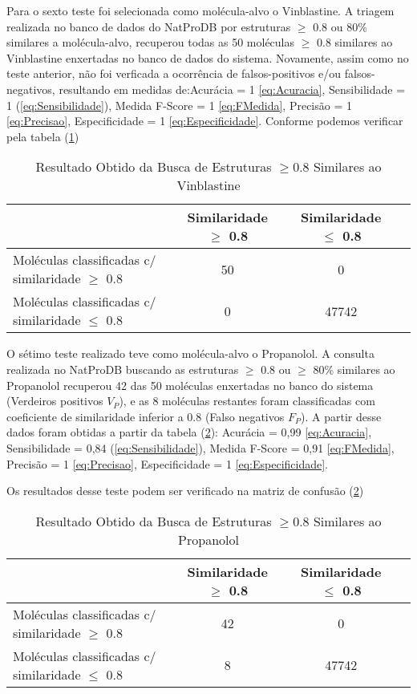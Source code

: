 Para o sexto teste foi selecionada como molécula-alvo o Vinblastine. A triagem realizada no banco de dados do NatProDB por estruturas $\geq$ 0.8 ou 80\% similares a molécula-alvo, recuperou todas as 50 moléculas $\geq$ 0.8 similares ao Vinblastine enxertadas no banco de dados do sistema. Novamente, assim como no teste anterior, não foi verficada a ocorrência de falsos-positivos e/ou falsos-negativos, resultando em medidas de:Acurácia = 1 \eqref{eq:Acuracia}, Sensibilidade = 1 (\ref{eq:Sensibilidade}), Medida F-Score = 1 \eqref{eq:FMedida}, Precisão = 1 \eqref{eq:Precisao},  Especificidade = 1 \eqref{eq:Especificidade}. Conforme podemos verificar pela tabela (\ref{tab:Vinblastine})

 \begin{table}[!htb]
	\centering
	\footnotesize
	\caption[Resultado Obtido da Busca de Estruturas $\geq$0.8 Similares ao Vinblastine]{Resultado Obtido da Busca de Estruturas $\geq$0.8 Similares ao Vinblastine}
	\label{tab:Vinblastine}	
	\begin{tabular}{p{4cm}ccc}
		\hline \SPACE
		\textbf{}&\textbf{Similaridade $\geq $ 0.8} & \textbf{Similaridade $\leq $ 0.8} \\ \hline \SPACE
	Moléculas classificadas c/ similaridade $\geq $ 0.8  &	50 & 0 \\ \hline \SPACE
	Moléculas classificadas c/ similaridade $\leq $ 0.8  & 0 & 47742\\ \hline 
	\end{tabular}
\end{table}

\newpage
O sétimo teste realizado teve como molécula-alvo o Propanolol. A consulta realizada no NatProDB buscando as estruturas $\geq$ 0.8 ou $\geq$ 80\% similares ao Propanolol recuperou 42 das 50 moléculas enxertadas no banco do sistema (Verdeiros positivos $V_P$), e as 8 moléculas restantes foram classificadas com coeficiente de similaridade inferior a 0.8 (Falso negativos $F_P$). A partir desse dados foram obtidas a partir da tabela (\ref{tab:Propanolol}): Acurácia = 0,99 \eqref{eq:Acuracia}, Sensibilidade = 0,84 (\ref{eq:Sensibilidade}), Medida F-Score = 0,91 \eqref{eq:FMedida}, Precisão = 1 \eqref{eq:Precisao},  Especificidade = 1 \eqref{eq:Especificidade}.  

Os resultados desse teste podem ser verificado na matriz de confusão (\ref{tab:Propanolol})
\begin{table}[!htb]
	\centering
	\footnotesize
	\caption[Resultado Obtido da Busca de Estruturas $\geq$0.8 Similares ao Propanolol]{Resultado Obtido da Busca de Estruturas $\geq$0.8 Similares ao Propanolol}
	\label{tab:Propanolol}	
	\begin{tabular}{p{4cm}ccc}
		\hline \SPACE
		\textbf{}&\textbf{Similaridade $\geq $ 0.8} & \textbf{Similaridade $\leq $ 0.8} \\ \hline \SPACE
	Moléculas classificadas c/ similaridade $\geq $ 0.8  &	42 & 0 \\ \hline \SPACE
	Moléculas classificadas c/ similaridade $\leq $ 0.8  & 8 & 47742\\ \hline 
	\end{tabular}
\end{table}

